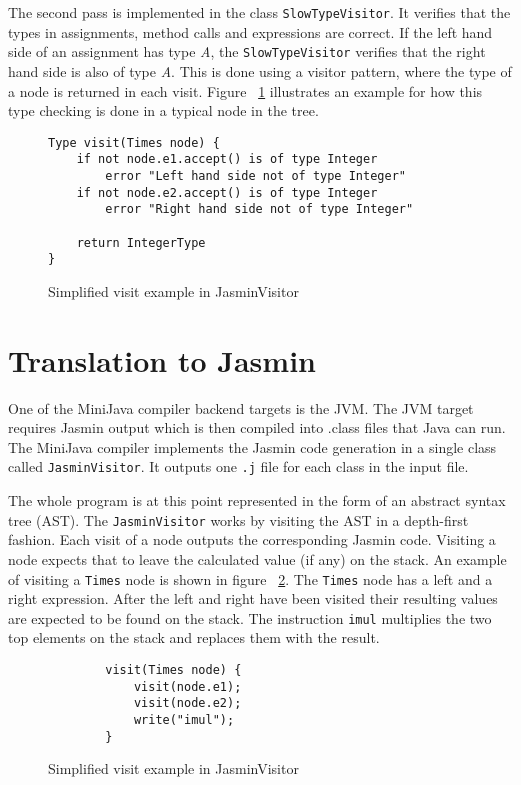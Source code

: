 \documentclass[11pt]{amsart}
\begin{document}
The second pass is implemented in the class \texttt{SlowTypeVisitor}. It verifies that the types in assignments, method calls and expressions are correct. If the left hand side of an assignment has type \textit{A}, the \texttt{SlowTypeVisitor} verifies that the right hand side is also of type \textit{A}. This is done using a visitor pattern, where the type of a node is returned in each visit. Figure ~\ref{fig:timestypecheck} illustrates an example for how this type checking is done in a typical node in the tree.

	\begin{figure}[H]
		\begin{verbatim}
Type visit(Times node) {
    if not node.e1.accept() is of type Integer
        error "Left hand side not of type Integer"
    if not node.e2.accept() is of type Integer
        error "Right hand side not of type Integer"

    return IntegerType
}
		\end{verbatim}
		\caption{Simplified visit example in JasminVisitor}
		\label{fig:timestypecheck}
	\end{figure}

\section{Translation to Jasmin}
	One of the MiniJava compiler backend targets is the JVM. The JVM target requires Jasmin\cite{jasmin} output which is then compiled into .class files that Java can run. The MiniJava compiler implements the Jasmin code generation in a single class called \texttt{JasminVisitor}. It outputs one \texttt{.j} file for each class in the input file.

The whole program is at this point represented in the form of an abstract syntax tree (AST). The \texttt{JasminVisitor} works by visiting the AST in a depth-first fashion. Each visit of a node outputs the corresponding Jasmin code. Visiting a node expects that to leave the calculated value (if any) on the stack. An example of visiting a \texttt{Times} node is shown in figure ~\ref{fig:timesexample}. The \texttt{Times} node has a left and a right expression. After the left and right have been visited their resulting values are expected to be found on the stack. The instruction \texttt{imul} multiplies the two top elements on the stack and replaces them with the result.

	\begin{figure}[H]
		\begin{verbatim}
		visit(Times node) {
		    visit(node.e1);
		    visit(node.e2);
		    write("imul");
		}
		\end{verbatim}
		\caption{Simplified visit example in JasminVisitor}
		\label{fig:timesexample}
	\end{figure}
\end{document}
